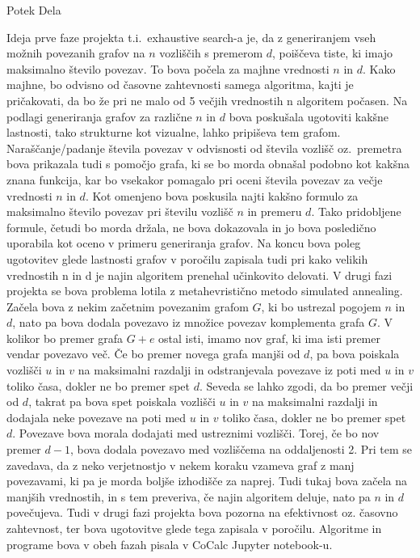 \documentclass[12pt,a4paper]{amsart}
\makeatletter
\renewcommand\section{\@startsection{section}{1}%
  \z@{.5\linespacing\@plus.7\linespacing}{.5\linespacing}%
  {\normalfont\scshape\large\centering}}
\theoremstyle{definition} %
\theoremstyle{plain} %
\makeatother
\begin{document}
\section{Potek Dela}

Ideja prve faze projekta t.i.\ exhaustive search-a je, da z generiranjem vseh možnih povezanih grafov na $n$ vozliščih s premerom $d$, poiščeva tiste, ki 
imajo maksimalno število povezav. To bova počela za majhne vrednosti $n$ in $d$. Kako majhne, bo odvisno od časovne zahtevnosti samega algoritma, kajti 
je pričakovati, da bo že pri ne malo od 5 večjih vrednostih n algoritem počasen. Na podlagi generiranja grafov za različne $n$ in $d$ bova poskušala
ugotoviti kakšne lastnosti, tako strukturne kot vizualne, lahko pripiševa tem grafom. Naraščanje/padanje števila povezav v odvisnosti od števila 
vozlišč oz.\ premetra bova prikazala tudi s pomočjo grafa, ki se bo morda obnašal podobno kot kakšna znana funkcija, kar bo vsekakor pomagalo pri oceni 
števila povezav za večje vrednosti $n$ in $d$. Kot omenjeno bova poskusila najti kakšno formulo za maksimalno število povezav pri številu vozlišč $n$ in premeru 
$d$. Tako pridobljene formule, četudi bo morda držala, ne bova dokazovala in jo bova posledično uporabila kot oceno v primeru generiranja grafov. Na koncu 
bova poleg ugotovitev glede lastnosti grafov v poročilu zapisala tudi pri kako velikih vrednostih n in d je najin algoritem prenehal učinkovito delovati. 
V drugi fazi projekta se bova problema lotila z metahevristično metodo simulated annealing. Začela bova z nekim začetnim povezanim grafom $G$, ki bo ustrezal 
pogojem $n$ in $d$, nato pa bova dodala povezavo iz množice povezav komplementa grafa \(G\). V kolikor bo premer grafa \(G + e\) ostal isti, imamo nov graf, ki 
ima isti premer vendar povezavo več. Če bo premer novega grafa manjši od $d$, pa bova poiskala vozlišči \(u\) in \(v\) na maksimalni razdalji in odstranjevala 
povezave iz poti med \(u\) in \(v\) toliko časa, dokler ne bo premer spet $d$. Seveda se lahko zgodi, da bo premer večji od $d$, takrat pa bova spet poiskala 
vozlišči \(u\) in \(v\) na maksimalni razdalji in dodajala neke povezave na poti med \(u\) in \(v\) toliko časa, dokler ne bo premer spet $d$. Povezave bova morala 
dodajati med ustreznimi vozlišči. Torej, če bo nov premer \(d-1\), bova dodala povezavo med vozliščema na oddaljenosti 2. Pri tem se zavedava, da z neko 
verjetnostjo v nekem koraku vzameva graf z manj povezavami, ki pa je morda boljše izhodišče za naprej. Tudi tukaj bova začela na manjših vrednostih, 
in s tem preveriva, če najin algoritem deluje, nato pa $n$ in $d$ povečujeva. Tudi v drugi fazi projekta bova pozorna na efektivnost oz. časovno zahtevnost, ter 
bova ugotovitve glede tega zapisala v poročilu.\newline 
Algoritme in programe bova v obeh fazah pisala v CoCalc Jupyter notebook-u.
\vspace{10pt}
\end{document}
